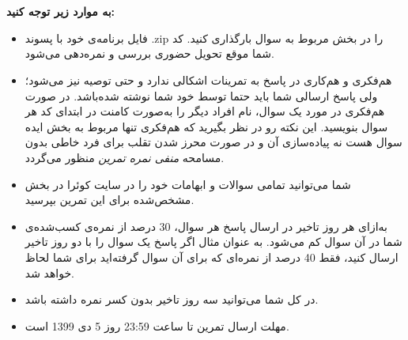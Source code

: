 \documentclass[]{article}
\begin{document}
 \Large \textbf{\\\\
به موارد زیر توجه کنید:}

\begin{itemize}[label=$\ast$]
\item  فایل برنامه‌ی خود با پسوند .zip را در بخش مربوط به سوال بارگذاری کنید. 
کد شما موقع تحویل حضوری بررسی و نمره‌دهی می‌شود.
\item هم‌فکری و هم‌کاری در پاسخ به تمرینات اشکالی ندارد و حتی توصیه نیز می‌شود؛ ولی پاسخ ارسالی شما باید حتما توسط خود شما نوشته شده‌باشد. در صورت هم‌فکری در مورد یک سوال، نام افراد دیگر را به‌صورت کامنت در ابتدای کد هر سوال بنویسید.  این نکته رو در نظر بگیرید که هم‌فکری تنها مربوط به بخش ایده سوال هست نه پیاده‌سازی آن و در صورت محرز شدن تقلب برای فرد خاطی بدون مسامحه \emph{ منفی نمره تمرین}
منظور می‌گردد. 
\item شما می‌توانید تمامی سوالات و ابهامات خود را در سایت کوئرا در بخش مشخص‌شده برای این تمرین بپرسید.
\item به‌ازای هر روز تاخیر در ارسال پاسخ هر سوال، 30 درصد از نمره‌ی کسب‌شده‌ی شما در آن سوال کم می‌شود. به عنوان مثال اگر پاسخ یک سوال را با دو روز تاخیر ارسال کنید، فقط 40 درصد از نمره‌ای که برای آن سوال گرفته‌اید برای شما لحاظ خواهد شد.
\item در کل شما می‌توانید سه روز تاخیر بدون کسر نمره داشته باشد.
\item مهلت ارسال تمرین تا ساعت 23:59 روز 5 دی 1399 است.
\end{itemize}



\newpage
\end{document}
